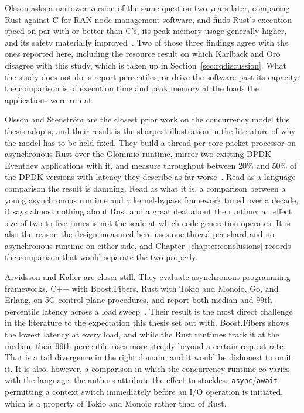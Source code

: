 \documentclass[english,oneside,a4paper,censored,csm,software-track-2020]{HYthesisML}
\begin{document}
Olsson asks a narrower version of the same question two years later, comparing Rust against C for
RAN node management software, and finds Rust's execution speed on par with or better than C's,
its peak memory usage generally higher, and its safety materially
improved~\cite{olsson2023ranmgmt}. Two of those three findings agree with the ones reported here,
including the resource result on which Karlb\"ack and Or\"o disagree with this study, which is
taken up in Section~\ref{sec:rqdiscussion}. What the study does not do is report percentiles, or
drive the software past its capacity: the comparison is of execution time and peak memory at the
loads the applications were run at.

Olsson and Stenstr\"om are the closest prior work on the concurrency model this thesis adopts,
and their result is the sharpest illustration in the literature of why the model has to be held
fixed. They build a thread-per-core packet processor on asynchronous Rust over the Glommio
runtime, mirror two existing DPDK Eventdev applications with it, and measure throughput between
20\% and 50\% of the DPDK versions with latency they describe as far
worse~\cite{olsson2023asyncpackets}. Read as a language comparison the result is damning. Read as
what it is, a comparison between a young asynchronous runtime and a kernel-bypass framework tuned
over a decade, it says almost nothing about Rust and a great deal about the runtime: an effect
size of two to five times is not the scale at which code generation operates. It is also the
reason the design measured here uses one thread per shard and no asynchronous runtime on either
side, and Chapter~\ref{chapter:conclusions} records the comparison that would separate the two
properly.

Arvidsson and Kaller are closer still. They evaluate asynchronous programming frameworks, C++
with Boost.Fibers, Rust with Tokio and Monoio, Go, and Erlang, on 5G control-plane procedures,
and report both median and 99th-percentile latency across a load
sweep~\cite{arvidsson2025async}. Their result is the most direct challenge in the literature to
the expectation this thesis set out with. Boost.Fibers shows the lowest latency at every load,
and while the Rust runtimes track it at the median, their 99th percentile rises more steeply
beyond a certain request rate. That is a tail divergence in the right domain, and it would be
dishonest to omit it. It is also, however, a comparison in which the concurrency runtime
co-varies with the language: the authors attribute the effect to stackless
\texttt{async}/\texttt{await} permitting a context switch immediately before an I/O operation is
initiated, which is a property of Tokio and Monoio rather than of Rust.
\end{document}
